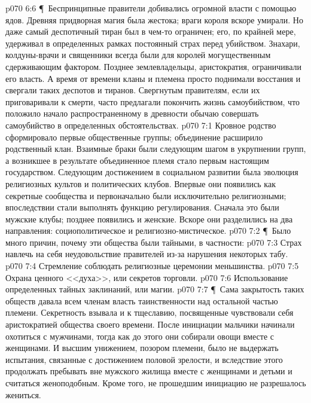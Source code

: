 \vs p070 6:6 \P\ Беспринципные правители добивались огромной власти с помощью ядов. Древняя придворная магия была жестока; враги короля вскоре умирали. Но даже самый деспотичный тиран был в чем\hyp{}то ограничен; его, по крайней мере, удерживал в определенных рамках постоянный страх перед убийством. Знахари, колдуны\hyp{}врачи и священники всегда были для королей могущественным сдерживающим фактором. Позднее землевладельцы, аристократия, ограничивали его власть. А время от времени кланы и племена просто поднимали восстания и свергали таких деспотов и тиранов. Свергнутым правителям, если их приговаривали к смерти, часто предлагали покончить жизнь самоубийством, что положило начало распространенному в древности обычаю совершать самоубийство в определенных обстоятельствах.
\vs p070 7:1 Кровное родство сформировало первые общественные группы; объединение расширило родственный клан. Взаимные браки были следующим шагом в укрупнении групп, а возникшее в результате объединенное племя стало первым настоящим государством. Следующим достижением в социальном развитии была эволюция религиозных культов и политических клубов. Впервые они появились как секретные сообщества и первоначально были исключительно религиозными; впоследствии стали выполнять функцию регулирования. Сначала это были мужские клубы; позднее появились и женские. Вскоре они разделились на два направления: социополитическое и религиозно\hyp{}мистическое.
\vs p070 7:2 \P\ Было много причин, почему эти общества были тайными, в частности:
\vs p070 7:3 \bibnobreakspace Страх навлечь на себя неудовольствие правителей из\hyp{}за нарушения некоторых табу.
\vs p070 7:4 \bibnobreakspace Стремление соблюдать религиозные церемонии меньшинства.
\vs p070 7:5 \bibnobreakspace Охрана ценного <<духа>>, или секретов торговли.
\vs p070 7:6 \bibnobreakspace Использование определенных тайных заклинаний, или магии.
\vs p070 7:7 \P\ Сама закрытость таких обществ давала всем членам власть таинственности над остальной частью племени. Секретность взывала и к тщеславию, посвященные чувствовали себя аристократией общества своего времени. После инициации мальчики начинали охотиться с мужчинами, тогда как до этого они собирали овощи вместе с женщинами. И высшим унижением, позором племени, было не выдержать испытания, связанные с достижением половой зрелости, и вследствие этого продолжать пребывать вне мужского жилища вместе с женщинами и детьми и считаться женоподобным. Кроме того, не прошедшим инициацию не разрешалось жениться.

